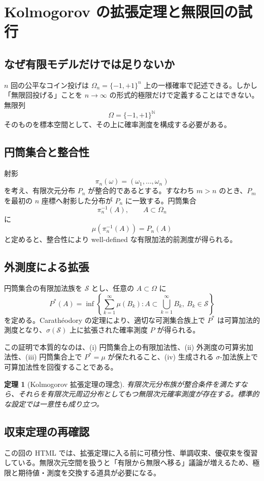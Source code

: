 \documentclass[a4paper,11pt,pdflatex,ja=standard,jafont=ipaex-type1,
  magstyle=real,scale=1]{bxjsarticle}
\newtheorem{theorem}{定理}[section]
\theoremstyle{definition}
\theoremstyle{remark}
\newcommand{\N}{\mathbb N}
\newcommand{\1}{\mathbf 1}
\begin{document}
\section{Kolmogorov の拡張定理と無限回の試行}
\subsection{なぜ有限モデルだけでは足りないか}
$n$ 回の公平なコイン投げは $\Omega_n=\{-1,+1\}^n$ 上の一様確率で記述できる。しかし「無限回投げる」ことを $n\to\infty$ の形式的極限だけで定義することはできない。無限列
\[
\Omega=\{-1,+1\}^{\N}
\]
そのものを標本空間として、その上に確率測度を構成する必要がある。

\subsection{円筒集合と整合性}
射影
\[
\pi_n(\omega)=(\omega_1,\dots,\omega_n)
\]
を考え、有限次元分布 $P_n$ が整合的であるとする。すなわち $m>n$ のとき、$P_m$ を最初の $n$ 座標へ射影した分布が $P_n$ に一致する。円筒集合
\[
\pi_n^{-1}(A),\qquad A\subset\Omega_n
\]
に
\[
\mu(\pi_n^{-1}(A))=P_n(A)
\]
と定めると、整合性により well-defined な有限加法的前測度が得られる。

\subsection{外測度による拡張}
円筒集合の有限加法族を $\mathcal S$ とし、任意の $A\subset\Omega$ に
\[
P^*(A)=\inf\left\{\sum_{k=1}^\infty \mu(B_k):
A\subset\bigcup_{k=1}^\infty B_k,\ B_k\in\mathcal S\right\}
\]
を定める。Carathéodory の定理により、適切な可測集合族上で $P^*$ は可算加法的測度となり、$\sigma(\mathcal S)$ 上に拡張された確率測度 $P$ が得られる。

この証明で本質的なのは、(i) 円筒集合上の有限加法性、(ii) 外測度の可算劣加法性、(iii) 円筒集合上で $P^*=\mu$ が保たれること、(iv) 生成される $\sigma$-加法族上で可算加法性を回復することである。

\begin{theorem}[Kolmogorov 拡張定理の理念]
有限次元分布族が整合条件を満たすなら、それらを有限次元周辺分布としてもつ無限次元確率測度が存在する。標準的な設定では一意性も成り立つ。
\end{theorem}

\subsection{収束定理の再確認}
この回の HTML では、拡張定理に入る前に可積分性、単調収束、優収束を復習している。無限次元空間を扱うと「有限から無限へ移る」議論が増えるため、極限と期待値・測度を交換する道具が必要になる。
\end{document}
